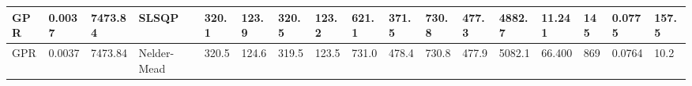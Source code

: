 \begin{tabular}{|lllllllllllllllll|}
\multicolumn{1}{|l|}{GPR} & \multicolumn{1}{l|}{0.0037} & \multicolumn{1}{l|}{7473.84} & \multicolumn{1}{l|}{SLSQP} & \multicolumn{1}{l|}{320.1} & \multicolumn{1}{l|}{123.9} & \multicolumn{1}{l|}{320.5} & \multicolumn{1}{l|}{123.2} & \multicolumn{1}{l|}{621.1} & \multicolumn{1}{l|}{371.5} & \multicolumn{1}{l|}{730.8} & \multicolumn{1}{l|}{477.3} & \multicolumn{1}{l|}{4882.7} & \multicolumn{1}{l|}{11.241} & \multicolumn{1}{l|}{145} & \multicolumn{1}{l|}{0.0775} & 157.5 \\ \hline
\multicolumn{1}{|l|}{GPR} & \multicolumn{1}{l|}{0.0037} & \multicolumn{1}{l|}{7473.84} & \multicolumn{1}{l|}{Nelder-Mead} & \multicolumn{1}{l|}{320.5} & \multicolumn{1}{l|}{124.6} & \multicolumn{1}{l|}{319.5} & \multicolumn{1}{l|}{123.5} & \multicolumn{1}{l|}{731.0} & \multicolumn{1}{l|}{478.4} & \multicolumn{1}{l|}{730.8} & \multicolumn{1}{l|}{477.9} & \multicolumn{1}{l|}{5082.1} & \multicolumn{1}{l|}{66.400} & \multicolumn{1}{l|}{869} & \multicolumn{1}{l|}{0.0764} & 10.2 \\ \hline
\end{tabular}